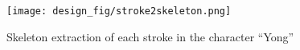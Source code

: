 \begin{figure}[H]
    \centering
    \texttt{[image: design\_fig/stroke2skeleton.png]}
    \caption{Skeleton extraction of each stroke in the character ``Yong''}
    \label{fig: stroke2skeleton}
\end{figure}




















